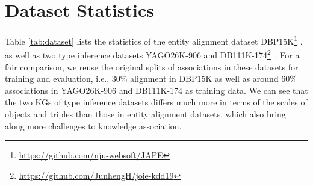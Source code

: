 \documentclass[11pt,a4paper]{article}
\begin{document}
\section{Dataset Statistics}
\label{appendix:data}
Table \ref{tab:dataset} lists the statistics of the entity alignment dataset DBP15K\footnote{\url{https://github.com/nju-websoft/JAPE}} \cite{JAPE}, as well as two type inference datasets YAGO26K-906 and DB111K-174\footnote{\url{https://github.com/JunhengH/joie-kdd19}}~\cite{JOIE}. For a fair comparison, we reuse the original splits of associations in these datasets for training and evaluation, i.e., 30\% alignment in DBP15K as well as around 60\% associations in YAGO26K-906 and DB111K-174 as training data. We can see that the two KGs of type inference datasets differs much more in terms of the scales of objects and triples than those in entity alignment datasets, which also bring along more challenges to knowledge association.
\begin{table}[!h]	
	\centering
	\caption{\label{tab:dataset}Statistics of the datasets used in this paper.}
\end{table}
\end{document}
